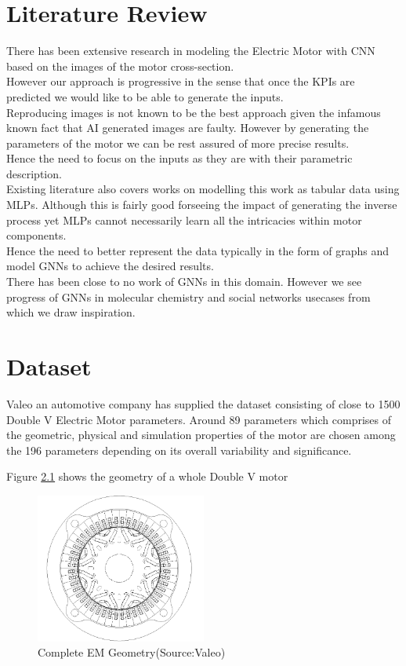 \documentclass{report} %
\begin{document}
\chapter{Literature Review} 
There has been extensive research in modeling the Electric Motor with \ac{CNN} based on the images of the motor cross-section. \\
However our approach is progressive in the sense that once the \ac{KPI}s are predicted we would like to be able to generate the inputs.\\
Reproducing images is not known to be the best approach given the infamous known fact that AI generated images are faulty. However by generating the parameters of the motor we can be rest assured of more precise results. \\
Hence the need to focus on the inputs as they are with their parametric description.\\
Existing literature also covers works on modelling this work as tabular data using \ac{MLP}s. 
Although this is fairly good forseeing the impact of generating the inverse process yet \ac{MLP}s cannot necessarily learn all the intricacies within motor components. \\
Hence the need to better represent the data typically in the form of graphs and model \ac{GNN}s to achieve the desired results. \\
There has been close to no work of \ac{GNN}s in this domain. However we see progress of \ac{GNN}s in molecular chemistry and social networks usecases from which we draw inspiration.\\

\newpage 

\chapter{Dataset} 
Valeo an automotive company has supplied the dataset consisting of close to 1500 Double V Electric Motor parameters. 
Around 89 parameters which comprises of the geometric, physical and simulation properties of the motor are chosen among the 196 parameters depending on its overall variability and significance.

Figure \ref{fig:Full Motor} shows the geometry of a whole Double V motor

\begin{figure}[H]
    \centering
    \includegraphics[width=0.5\textwidth]{./ReportImages/FullMotorv2.png} 
    \caption{Complete EM Geometry(Source:Valeo)}
    \label{fig:Full Motor}
\end{figure}
\end{document}
